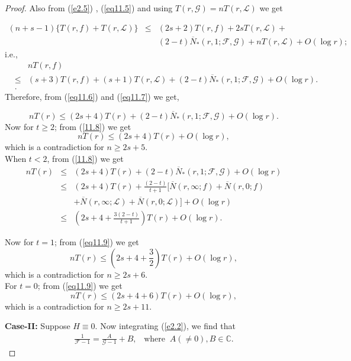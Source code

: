 \documentclass[a4paper,draft]{amsproc}
\theoremstyle{plain}
\theoremstyle{definition}
\theoremstyle{remark}
\newcommand{\ol}{\overline}
\newcommand{\be}{\begin{equation}}
\newcommand{\ee}{\end{equation}}
\newcommand{\bea}{\begin{eqnarray}}
\newcommand{\eea}{\end{eqnarray}}
\numberwithin{equation}{section}
\renewcommand{\leq}{\leqslant}\renewcommand{\geq}{\geqslant}
\begin{document}
\begin{proof}
Also from (\ref{e2.5}) , (\ref{eq11.5}) and using $T(r,\mathcal{G})=nT(r,\mathcal{L})$ we get

\bea(n+s-1)\{T(r,f)+T(r,\mathcal{L})\}\nonumber&\leq&(2s+2)T(r,f)+2sT(r,\mathcal{L})+\\\nonumber&&(2-t)\ol N_{*}(r,1;\mathcal{F},\mathcal{G})+nT(r,\mathcal{L})+O(\log r);\eea
i.e.,
\bea\label{eq11.7}&& nT(r,f)\\\nonumber
&\leq& (s+3)T(r,f)+(s+1)T(r,\mathcal{L})+(2-t)\ol N_{*}(r,1;\mathcal{F},\mathcal{G})+O(\log r).\\\nonumber&
.\nonumber\eea
Therefore, from (\ref{eq11.6}) and (\ref{eq11.7}) we get,

\be\label{11.8}nT(r)\leq (2s+4)T(r)+(2-t)\ol N_{*}(r,1;\mathcal{F},\mathcal{G})+O(\log r).\ee
Now for $t\geq2$; from (\ref{11.8}) we get$$nT(r)\leq (2s+4)T(r)+O(\log r),$$
which is a contradiction for $n\geq 2s+5$.\\          
When $t <2$, from (\ref{11.8}) we get
\bea\label{eq11.9} nT(r)
&\leq& (2s+4)T(r)+(2-t)\ol N_{*}(r,1;\mathcal{F},\mathcal{G})+O(\log r)\\\nonumber&
\leq& (2s+4)T(r)+\frac{(2-t)}{t+1}[\ol{ N}(r,\infty;f)+\ol{ N}(r,0;f)\\\nonumber&&+\ol{ N}(r,\infty;\mathcal{L})+\ol{ N}(r,0;\mathcal{L})]+O(\log r) \nonumber\\&\leq& \left(2s+4+\frac{3(2-t)}{t+1}\right)T(r)+O(\log r)
.\nonumber\eea

Now for $t=1$; from (\ref{eq11.9}) we get$$nT(r)\leq (2s+4+\frac{3}{2})T(r)+O(\log r),$$
which is a contradiction for $n\geq 2s+6$.\\  
For $t=0$; from (\ref{eq11.9}) we get $$nT(r)\leq (2s+4+6)T(r)+O(\log r),$$
which is a contradiction for $n\geq 2s+11$.\\



\vspace{0.1in}\par{\bf Case-II:} Suppose	$H\equiv0$. Now integrating (\ref{e2.2}), we find that \bea\nonumber \frac{1}{\mathcal{F}-1}=\frac{A}{\mathcal{G}-1}+B,\;\;\; \mbox{where}\;\; A(\neq0), B\in\mathbb{C}.\eea 	
\end{proof}
\end{document}
